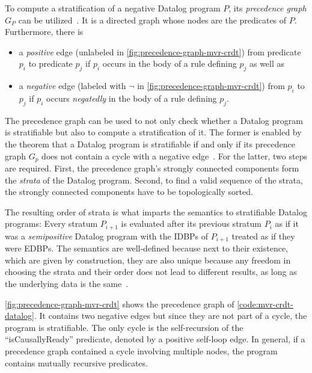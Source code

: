 To compute a stratification of a negative Datalog program \(P\),
its \emph{precedence graph} \(G_P\) can be utilized~\cite{green2013datalog}.
It is a directed graph whose nodes are the predicates of \(P\).
Furthermore, there is

\begin{itemize}
	\item a \emph{positive} edge
	      (unlabeled in \ref{fig:precedence-graph-mvr-crdt})
	      from predicate \(p_i\) to predicate \(p_j\)
	      if \(p_i\) occurs in the body of a rule defining \(p_j\) as well as
	\item a \emph{negative} edge
	      (labeled with \(\lnot\) in \ref{fig:precedence-graph-mvr-crdt})
	      from \(p_i\) to \(p_j\)
	      if \(p_i\) occurs \emph{negatedly} in the body of a rule defining \(p_j\).
\end{itemize}

The precedence graph can be used to not only check whether a Datalog
program is stratifiable but also to compute a stratification of it.
The former is enabled by the theorem that a Datalog program is stratifiable
if and only if its precedence graph \(G_p\) does not contain a cycle
with a negative edge~\cite{green2013datalog}.
For the latter, two steps are required.
First, the precedence graph's strongly connected components form the
\emph{strata} of the Datalog program.
Second, to find a valid sequence of the strata,
the strongly connected components have to be topologically sorted.

The resulting order of strata is what imparts the semantics to stratifiable
Datalog programs:
Every stratum \(P_{i+1}\) is evaluated after its previous stratum \(P_{i}\)
as if it was a \emph{semipositive} Datalog program with the \acp{IDBP}
of \(P_{i+1}\) treated as if they were \acp{EDBP}.
The semantics are well-defined because next to their existence,
which are given by construction, they are also unique because any freedom
in choosing the strata and their order does not lead to different results,
as long as the underlying data is the same~\cite{apt1988towards}.

\ref{fig:precedence-graph-mvr-crdt} shows the precedence graph
of \ref{code:mvr-crdt-datalog}.
It contains two negative edges but since they are not part of a cycle,
the program is stratifiable.
The only cycle is the self-recursion of the ``isCausallyReady'' predicate,
denoted by a positive self-loop edge.
In general, if a precedence graph contained a cycle involving multiple nodes,
the program contains mutually recursive predicates.

